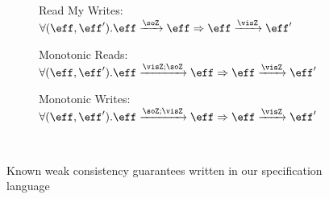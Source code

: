 \begin{figure}[t]
        \centering
	\begin{subfigure}[b]{0.3\textwidth}
	\caption{Read My Writes: \\
	$\forall(\eff,\eff'). \eff \xrightarrow{\soZ} \eff \Rightarrow
	\eff \xrightarrow{\visZ} \eff'$}
	\end{subfigure}
	\vrule
	\hfill
	\begin{subfigure}[b]{0.3\textwidth}
	\caption{Monotonic Reads: 
	\\	$\forall(\eff,\eff'). \eff \xrightarrow{\visZ;\soZ} \eff \Rightarrow
	\eff \xrightarrow{\visZ} \eff' $}
	\end{subfigure}
	\vrule
	\hfill
	\begin{subfigure}[b]{0.25\textwidth}
	\caption{Monotonic Writes:
	\\	$\forall(\eff,\eff'). \eff \xrightarrow{\soZ;\visZ} \eff \Rightarrow
	\eff \xrightarrow{\visZ} \eff' $}
	\end{subfigure}
\\ \hrulefill

\caption{Known weak consistency guarantees written in our specification
language}
\label{fig:ctrt_rep}
\end{figure}


